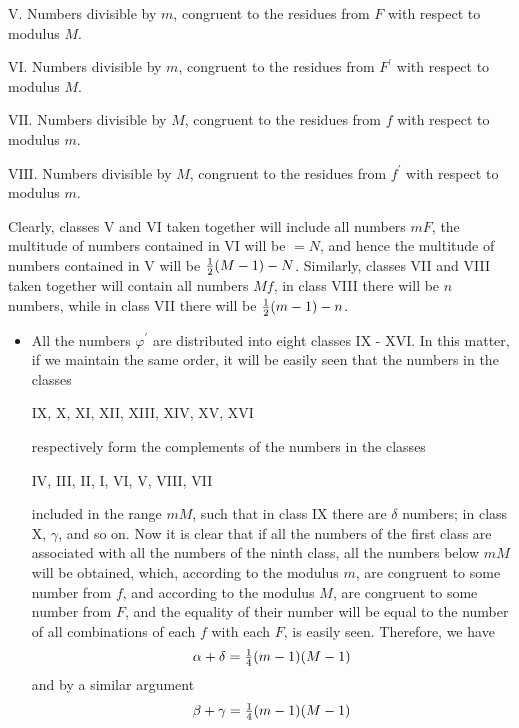\documentclass[twoside,12pt, showframe]{memoir}
\let\oldfrac\frac
\def\frac#1#2{\mathchoice{\tfrac{#1}{#2}}{\oldfrac{#1}{#2}}{\genfrac{}{}{}{2}{#1}{#2\mathstrut}}{\genfrac{}{}{}{3}{#1}{#2\mathstrut}}}
\begin{document}
\(\text{V.}\) Numbers divisible by \(m\), congruent to the residues from \(F\) with respect to modulus \(M\).

\(\text{VI.}\) Numbers divisible by \(m\), congruent to the residues from \(F^{\prime}\) with respect to modulus \(M\).

\(\text{VII.}\) Numbers divisible by \(M\), congruent to the residues from \(f\) with respect to modulus \(m\).

\(\text{VIII.}\) Numbers divisible by \(M\), congruent to the residues from \(f^{\prime}\) with respect to modulus \(m\).

Clearly, classes V and VI taken together will include all numbers \(mF\), the multitude of numbers contained in VI will be \(=N\), and hence the multitude of numbers contained in V will be \(\frac{1}{2}(M-1)-N\). Similarly, classes VII and VIII taken together will contain all numbers \(Mf\), in class VIII there will be \(n\) numbers, while in class VII there will be \(\frac{1}{2}(m-1)-n\).
%

\begin{itemize}
    \item All the numbers \(\varphi^{\prime}\) are distributed into eight classes IX - XVI. In this matter, if we maintain the same order, it will be easily seen that the numbers in the classes
    \begin{center} IX, X, XI, XII, XIII, XIV, XV, XVI \end{center}
    respectively form the complements of the numbers in the classes
    \begin{center} IV, III, II, I, VI, V, VIII, VII \end{center}
    included in the range \(m M\), such that in class IX there are \(\delta\) numbers; in class X, \(\gamma\), and so on. Now it is clear that if all the numbers of the first class are associated with all the numbers of the ninth class, all the numbers below \(m M\) will be obtained, which, according to the modulus \(m\), are congruent to some number from \(f\), and according to the modulus \(M\), are congruent to some number from \(F\), and the equality of their number will be equal to the number of all combinations of each \(f\) with each \(F\), is easily seen. Therefore, we have
    \[\alpha+\delta=\frac{1}{4}(m-1)(M-1)\]
    and by a similar argument
    \[\beta+\gamma=\frac{1}{4}(m-1)(M-1)\]
\end{itemize}
%
\end{document}
